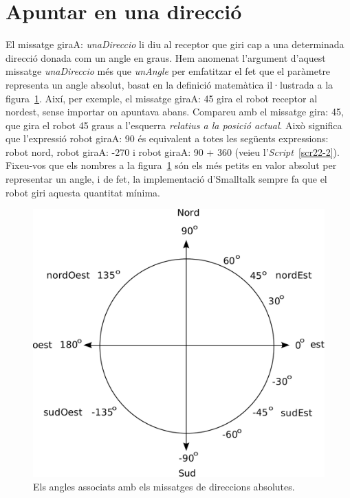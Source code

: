 \section{Apuntar en una direcció}
El missatge \textsf{giraA: {\itshape unaDireccio}} li diu al receptor que giri cap a una determinada direcció donada com un angle en graus. Hem anomenat l'argument d'aquest missatge \textsf{{\itshape unaDireccio}} més que \textsf{{\itshape unAngle}} per emfatitzar el fet que el paràmetre representa un angle absolut, basat en la definició matemàtica il·lustrada a la figura~\ref{fig2201}. Així, per exemple, el missatge \textsf{giraA: 45} gira el robot receptor al nordest, sense importar on apuntava abans. Compareu amb el missatge \textsf{gira: 45}, que gira el robot 45 graus a l'esquerra \emph{relatius a la posició actual}. Això significa que l'expressió \textsf{robot giraA: 90} és equivalent a totes les següents expressions: \textsf{robot nord}, \textsf{robot giraA: -270} i \textsf{robot giraA: 90 + 360} (veieu l'\emph{Script}~\ref{scr22-2}). Fixeu-vos que els nombres a la figura~\ref{fig2201} són els més petits en valor absolut per representar un angle, i de fet, la implementació d'Smalltalk sempre fa que el robot giri aquesta quantitat mínima.  
\begin{figure}[h!]
\begin{center}
\includegraphics[scale=0.2]{Imatges/figura22-1}
\end{center}
\caption{Els angles associats amb els missatges de direccions absolutes.}
\label{fig2201}
\end{figure}
